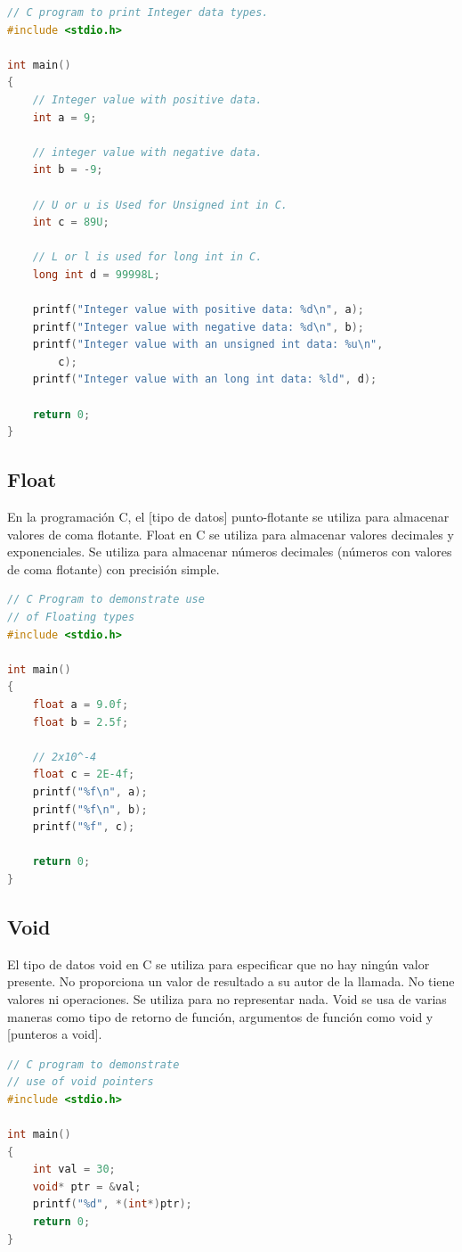 \documentclass{article}
\begin{document}
\begin{lstlisting}[style=mystyle, language=C]
// C program to print Integer data types.
#include <stdio.h>

int main()
{
	// Integer value with positive data.
	int a = 9;

	// integer value with negative data.
	int b = -9;

	// U or u is Used for Unsigned int in C.
	int c = 89U;

	// L or l is used for long int in C.
	long int d = 99998L;

	printf("Integer value with positive data: %d\n", a);
	printf("Integer value with negative data: %d\n", b);
	printf("Integer value with an unsigned int data: %u\n",
		c);
	printf("Integer value with an long int data: %ld", d);

	return 0;
}
\end{lstlisting}

\subsection{Float}
En la programación C, el [tipo de datos] punto-flotante se utiliza para almacenar valores de coma flotante. Float en C se utiliza para almacenar valores decimales y exponenciales. Se utiliza para almacenar números decimales (números con valores de coma flotante) con precisión simple.

\begin{lstlisting}[style=mystyle, language=C]
// C Program to demonstrate use
// of Floating types
#include <stdio.h>

int main()
{
	float a = 9.0f;
	float b = 2.5f;

	// 2x10^-4
	float c = 2E-4f;
	printf("%f\n", a);
	printf("%f\n", b);
	printf("%f", c);

	return 0;
}
\end{lstlisting}

\subsection{Void}
El tipo de datos void en C se utiliza para especificar que no hay ningún valor presente. No proporciona un valor de resultado a su autor de la llamada. No tiene valores ni operaciones. Se utiliza para no representar nada. Void se usa de varias maneras como tipo de retorno de función, argumentos de función como void y [punteros a void].

\begin{lstlisting}[style=mystyle, language=C]
// C program to demonstrate
// use of void pointers
#include <stdio.h>

int main()
{
	int val = 30;
	void* ptr = &val;
	printf("%d", *(int*)ptr);
	return 0;
}
\end{lstlisting}
\end{document}
